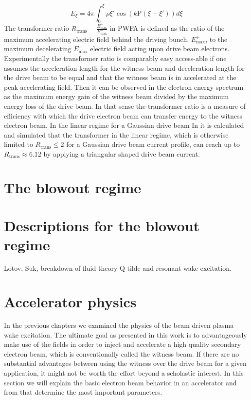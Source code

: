 \begin{equation}
E_\xi=4\pi \int_0^\xi \rho{\xi'}\cos(k\mathrm{P}(\xi-\xi'))d\xi
\end{equation}
The transformer ratio $R_\mathrm{trans}=\frac{E_\mathrm{max}^+}{E_\mathrm{max}^-} $ in PWFA is defined as
the ratio of the maximum accelerating electric field
behind the driving bunch, $E_\mathrm{max}^+$, to the maximum decelerating $E_\mathrm{max}^-$
electric field acting upon drive beam electrons. Experimentally the transformer ratio is comparably easy access-able if one assumes the acceleration length for the witness beam and deceleration length for the drive beam to be equal and that the  witness beam is in accelerated at the peak accelerating field.
Then it can be observed in the electron energy spectrum as the maximum energy gain of the witness beam divided by the maximum energy loss of the drive beam. In that sense the transformer ratio is a measure of efficiency with which the drive electron beam can transfer energy to the witness electron beam. 
In the linear regime for a Gaussian drive beam 
In \cite{PhysRevLett.56.1252} it is calculated and simulated that the transformer in the linear regime, which is otherwise limited to $R_\mathrm{trans}\leq 2$ for a Gaussian drive beam current profile, can reach up to $R_\mathrm{trans}\approx 6.12$ by applying a triangular shaped drive beam current.
\section{The blowout regime}

\section{Descriptions for the blowout regime}
Lotov, Suk, breakdown of fluid theory
Q-tilde and resonant wake excitation.


\section{Accelerator physics}
In the previous chapters we examined the physics of the beam driven plasma wake excitation. 
The ultimate goal as presented in this work is to advantageously make use of the fields in order to inject and accelerate a high quality secondary electron beam, which is conventionally called the witness beam. If there are no substantial advantages between  using the witness over the drive beam for a given application, it might not be worth the effort beyond a scholastic interest.
In this section we will explain the basic electron beam behavior in an accelerator and from that determine the most important parameters. 
